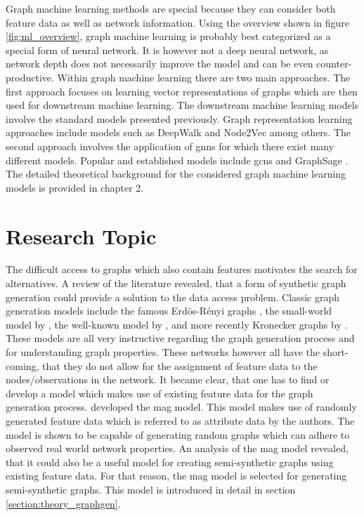 	\noindent Graph machine learning methods are special because they can 
	consider both feature data as well as network information. Using the
	overview shown in figure \ref{fig:ml_overview}, graph machine learning is
	probably best categorized as a special form of neural network. It is 
	however not a deep neural network, as network depth does not necessarily 
	improve the model and can be even counter-productive. Within graph machine 
	learning there are two main approaches. The first approach focuses on 
	learning vector representations of graphs which are then used for downstream 
	machine learning. The downstream machine learning models involve the standard 
	models presented previously. Graph representation learning approaches include 
	models such as DeepWalk \citep{perozzi2014deepwalk} and Node2Vec 
	\citep{grover2016node2vec} among others. The second approach involves the 
	application of \acp{gnn} for which there exist many different 
	models. Popular and established models include \acp{gcn}
	\citep{kipf2016semi} and GraphSage \citep{hamilton2017inductive}. The detailed 
	theoretical background for the considered graph machine learning models is 
	provided in chapter 2.

	\section{Research Topic}
	\label{section:research_topics}

	\noindent The difficult access to graphs which also contain features 
	motivates the search for alternatives. A review of the literature revealed, 
	that a form of synthetic graph generation could provide a solution to the data 
	access problem. Classic graph generation models include the famous 
	Erdös-Rényi graphs \citeyearpar{erdos1959random}, the small-world model by 
	\cite{watts1998collective}, the well-known model by 
	\cite{barabasi1999emergence}, and more recently Kronecker graphs by
	\cite{leskovec2010kronecker}. These models are all very instructive
	regarding the graph generation process and for understanding graph
	properties. These networks however all have the short-coming, that they do 
	not allow for the assignment of feature data to the nodes/observations in the
	network. It became clear, that one has to find or develop a model which 
	makes use of existing feature data for the graph generation process. 
	\cite{kim2012multiplicative} developed the \ac{mag} model. This model makes 
	use of randomly generated feature data which is referred to as attribute data 
	by the authors. The model is shown to be capable of generating random graphs 
	which can adhere to observed real world network properties. An analysis of 
	the \ac{mag} model revealed, that it could also be a useful model for 
	creating semi-synthetic graphs using existing feature data. For that reason, 
	the \acs{mag} model is selected for generating semi-synthetic graphs. This 
	model is introduced in detail in section \ref{section:theory_graphgen}. \\


